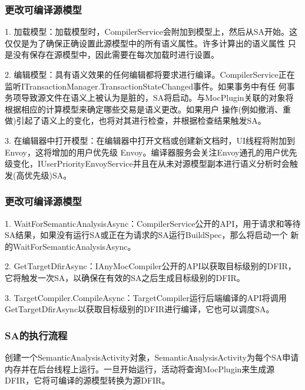 \documentclass[UTF8]{ctexart}
\begin{document}
\subsubsection{更改可编译源模型}
1. 加载模型：加载模型时，CompilerService会附加到模型上，然后从SA开始。这仅仅是为了确保正确设置此源模型中的所有语义属性。许多计算出的语义属性
只是没有保存在源模型中，因此需要在每次加载时进行设置。
\par
2. 编辑模型：具有语义效果的任何编辑都将要求进行编译。CompilerService正在监听ITransactionManager.TransactionStateChanged事件。如果事务中有任
何事务项导致源文件在语义上被认为是脏的，SA将启动。与MocPlugin关联的对象将根据相应的计算模型来确定哪些交易是语义更改。如果用户
操作(例如撤消、重做)引起了语义上的变化，也将对其进行检查，并根据检查结果触发SA。
\par
3. 在编辑器中打开模型：在编辑器中打开文档或创建新文档时，UI线程将附加到Envoy，这将增加的用户优先级 Envoy。编译器服务会关注Envoy通孔的用户优先
级变化，IUserPriorityEnvoyService并且在从未对源模型副本进行语义分析时会触发(高优先级)SA。
\subsubsection{更改可编译源模型}
1. WaitForSemanticAnalysisAsync：CompilerService公开的API，用于请求和等待SA结果，如果没有运行SA或正在为请求的SA运行BuildSpec，那么将启动一个
新的WaitForSemanticAnalysisAsync。
\par
2. GetTargetDfirAsync：IAnyMocCompiler公开的API以获取目标级别的DFIR，它将触发一次SA，以确保在有效的SA之后生成目标级别的DFIR。
\par
3. TargetCompiler.CompileAsync：TargetCompiler运行后端编译的API将调用GetTargetDfirAsync以获取目标级别的DFIR进行编译，它也可以调度SA。
\subsubsection{SA的执行流程}
创建一个SemanticAnalysisActivity对象，SemanticAnalysisActivity为每个SA申请内存并在后台线程上运行。一旦开始运行，活动将查询MocPlugin来生成源
DFIR，它将可编译的源模型转换为源DFIR。
\par
\end{document}
